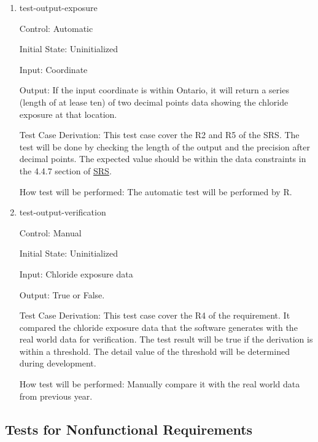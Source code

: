 \documentclass[12pt, titlepage]{article}
\begin{document}
\begin{enumerate}

\item{test-output-exposure\\}

Control: Automatic
					
Initial State: Uninitialized
					
Input: Coordinate
					
Output: If the input coordinate is within Ontario, it will return a series (length of at lease ten) of two decimal points data showing the chloride exposure at that location.

Test Case Derivation: This test case cover the R2 and R5 of the SRS. The test will be done by checking the length of the output and the precision after decimal points. The expected value should be within the data constraints in the 4.4.7 section of \href{https://github.com/CynthiaLiu0805/BridgeCorrosion/blob/main/docs/SRS/SRS.pdf}{SRS}.

					
How test will be performed: The automatic test will be performed by R.


\item{test-output-verification\\}

Control: Manual
					
Initial State: Uninitialized
					
Input: Chloride exposure data
					
Output: True or False.

Test Case Derivation: This test case cover the R4 of the requirement. It compared the chloride exposure data that the software generates with the real world data for verification. The test result will be true if the derivation is within a threshold. The detail value of the threshold will be determined during development.

					
How test will be performed: Manually compare it with the real world data from previous year. 
\end{enumerate}


\subsection{Tests for Nonfunctional Requirements}
\end{document}
